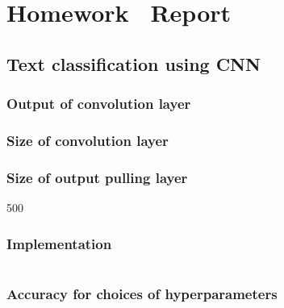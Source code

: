 \documentclass[12pt]{article}
\begin{document}
\section{Homework \thesection\ Report}
\subsection{Text classification using CNN}

\subsubsection{Output of convolution layer}
\subsubsection{Size of convolution layer}
\subsubsection{Size of output pulling layer}
500
\subsubsection{Implementation}
\inputminted[frame=single,framesep=10pt,linenos, breaklines,xleftmargin=\parindent,xrightmargin=\parindent]{python}{./Homework3/code/cnn.py}
\subsubsection{Accuracy for choices of hyperparameters}
\end{document}
